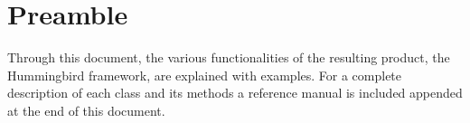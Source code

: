 \chapter{Preamble}\label{ch:preamble}

Through this document, the various functionalities of the resulting product, the Hummingbird 
framework, are explained with examples. For a complete description of each class and 
its methods a reference manual is included appended at the end of this document.
